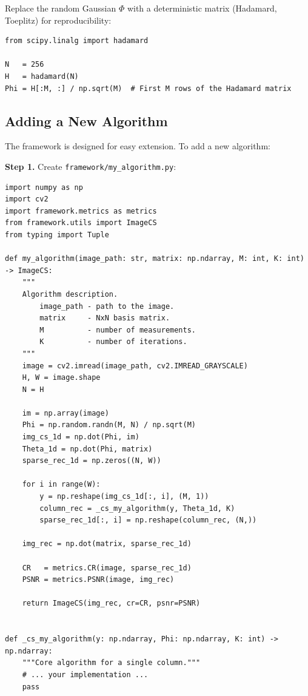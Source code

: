 \documentclass[12pt,a4paper]{article}
\newcommand{\cs}[1]{\texttt{#1}}          %
\begin{document}
Replace the random Gaussian $\Phi$ with a deterministic matrix (Hadamard,
Toeplitz) for reproducibility:

\begin{lstlisting}[style=python]
from scipy.linalg import hadamard

N   = 256
H   = hadamard(N)
Phi = H[:M, :] / np.sqrt(M)  # First M rows of the Hadamard matrix
\end{lstlisting}

\subsection{Adding a New Algorithm}

The framework is designed for easy extension.  To add a new algorithm:

\textbf{Step 1.} Create \cs{framework/my\_algorithm.py}:

\begin{lstlisting}[style=python]
import numpy as np
import cv2
import framework.metrics as metrics
from framework.utils import ImageCS
from typing import Tuple

def my_algorithm(image_path: str, matrix: np.ndarray, M: int, K: int) -> ImageCS:
    """
    Algorithm description.
        image_path - path to the image.
        matrix     - NxN basis matrix.
        M          - number of measurements.
        K          - number of iterations.
    """
    image = cv2.imread(image_path, cv2.IMREAD_GRAYSCALE)
    H, W = image.shape
    N = H

    im = np.array(image)
    Phi = np.random.randn(M, N) / np.sqrt(M)
    img_cs_1d = np.dot(Phi, im)
    Theta_1d = np.dot(Phi, matrix)
    sparse_rec_1d = np.zeros((N, W))

    for i in range(W):
        y = np.reshape(img_cs_1d[:, i], (M, 1))
        column_rec = _cs_my_algorithm(y, Theta_1d, K)
        sparse_rec_1d[:, i] = np.reshape(column_rec, (N,))

    img_rec = np.dot(matrix, sparse_rec_1d)

    CR   = metrics.CR(image, sparse_rec_1d)
    PSNR = metrics.PSNR(image, img_rec)

    return ImageCS(img_rec, cr=CR, psnr=PSNR)


def _cs_my_algorithm(y: np.ndarray, Phi: np.ndarray, K: int) -> np.ndarray:
    """Core algorithm for a single column."""
    # ... your implementation ...
    pass
\end{lstlisting}
\end{document}
